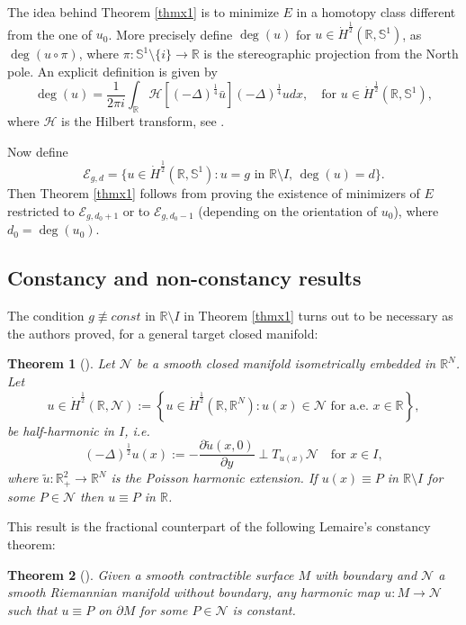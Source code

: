 \documentclass[12pt, a4paper]{article}
\newtheorem{thmx}{Theorem}
\newcommand{\M}[1]{\mathcal{#1}}
\newcommand{\sph}{\mathbb{S}}
\newcommand{\de}{\partial}
\newcommand{\R}{\mathbb{R}}
\renewcommand{\(}{\left(}
\renewcommand{\)}{\right)}
\begin{document}
The idea behind Theorem \ref{thmx1} is to minimize $E$ in a homotopy class different from the one of $u_0$. More precisely define $\deg(u)$ for $u\in \dot H^{\frac12}(\R, \sph^1)$, as $\deg(u\circ\pi)$, where $\pi:\sph^1\setminus\{i\}\to \R$ is the stereographic projection {from the North pole}.
{An explicit definition is given by
\begin{equation}\label{defdeg1}
\deg(u)=\frac{1}{2\pi i}\int_\R \mathcal{H}[(-\Delta)^\frac14 \bar u] (-\Delta)^\frac14 u dx,\quad \text{for }u\in \dot H^{\frac12}(\R, \sph^1),\end{equation}
where $\mathcal{H}$ is the Hilbert transform, see \cite[Section 2]{HM}.}

Now define
$$\M{E}_{g,d}=\{u\in \dot H^{\frac12}(\R,\sph^1): u=g \text{ in }{\R\setminus I},\, \deg(u)=d\}.$$
Then Theorem \ref{thmx1} follows from proving the existence of minimizers of $E$ restricted to ${\M{E}_{g,d_0+ 1}}$ or to ${\M{E}_{g,d_0- 1}}$ (depending on the orientation of $u_0$), where $d_0=\deg(u_0)$.


\subsection{Constancy and non-constancy results}

The condition $g\not\equiv const$ in $\R\setminus I$ in Theorem \ref{thmx1} turns out to be necessary as the authors proved, for a general target closed manifold:

\begin{thmx}[\cite{HM}]\label{thmx2} Let  $\mathcal{N}$ be a smooth closed manifold isometrically embedded in $\R^N$.  Let $$u\in \dot H^{\frac12}(\R,\mathcal{N}):=\left\{u\in \dot H^{\frac12}(\R, \R^N): u(x)\in \mathcal{N} \text{ for a.e. }x\in\R\right\},$$
be half-harmonic in $I$, i.e.
\begin{equation}\label{eq12harmN}
(-\Delta)^\frac{1}{2} u(x):=-\frac{\de \tilde u(x,0)}{\de y} \perp T_{u(x)} \mathcal{N} \quad \text{for }x\in I,
\end{equation}
where $\tilde u:\R^2_+\to \R^N$ is the Poisson harmonic extension. If $u(x)\equiv P$ in $\R\setminus I$ for some $P\in \mathcal{N}$    then $u\equiv P$ in $\R$.
\end{thmx}

This result is the fractional counterpart of the following Lemaire's constancy theorem:

\begin{thmx}[\cite{lem}]\label{thmx3} Given a smooth contractible surface $M$ with boundary and $\mathcal{N}$ a smooth Riemannian manifold without boundary, any harmonic map $u:M\to \mathcal{N}$ such that $u\equiv P$ on $\partial M$ for some $P\in \mathcal{N}$ is constant.
\end{thmx}
\end{document}
